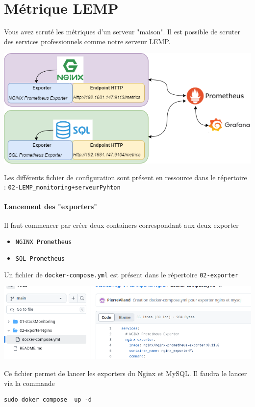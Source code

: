 \documentclass[french, 12pt]{article}%
\newcommand{\itemE}{\item[$\bullet$]}
\begin{document}
 
 
\section{Métrique LEMP}
Vous avez scruté les métriques d'un serveur "maison".  Il est possible de scruter des services professionnels comme notre serveur LEMP. 


\begin{center}
\includegraphics[scale=0.7]{./ressource/schemaPrometheus-LEMP_Prometheuse.drawio.png}
\end{center}

Les différents fichier de configuration sont présent en ressource dans le répertoire : \verb?02-LEMP_monitoring+serveurPyhton?


\paragraph{Lancement des "exporters"}
Il faut commencer par créer deux containers correspondant aux deux exporter
\begin{itemize}
\itemE \verb?NGINX Prometheus?
\itemE \verb?SQL Prometheus?
\end{itemize}


Un fichier de \verb?docker-compose.yml? est présent dans le répertoire \verb?02-exporter?
\begin{center}
\includegraphics[scale=0.4]{./ressource/visuDockerExporter}
\end{center}
Ce fichier permet de lancer les exporters du Nginx et MySQL. Il faudra le lancer via la commande
\begin{lstlisting}[style=commande]
sudo doker compose  up -d
\end{lstlisting}
\end{document}
